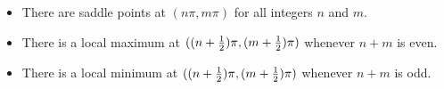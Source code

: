 \documentclass[9pt]{beamer}
\begin{document}
\begin{frame}[t]
{ }
 \begin{itemize}
  \item<2-> There are saddle points at $(n\pi,m\pi)$ for all integers $n$ and $m$.
  \item<3-> There is a local maximum at $((n+\tfrac{1}{2})\pi,(m+\tfrac{1}{2})\pi)$ whenever $n+m$ is even.
  \item<4-> There is a local minimum at $((n+\tfrac{1}{2})\pi,(m+\tfrac{1}{2})\pi)$ whenever $n+m$ is odd.
 \end{itemize}
\end{frame}
\end{document}
